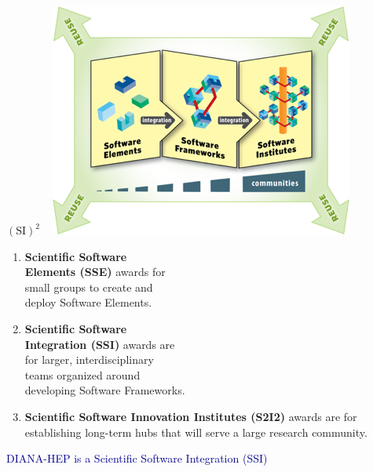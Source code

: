 \documentclass{beamer}
\begin{document}

\begin{frame}{$(\mbox{SI})^2$}
\vspace{0.75 cm}
\mbox{ } \hfill \mbox{\hspace{0.4 cm}\includegraphics[height=4 cm]{puzzle.png}\hspace{-0.4 cm}}

\vspace{-4 cm}
\begin{enumerate}
\item {\bf Scientific Software \\ Elements (SSE)} awards for \\ small groups to create and \\ deploy Software Elements.
\item {\bf Scientific Software \\ Integration (SSI)} awards are \\ for larger, interdisciplinary \\ teams organized around \\ developing Software Frameworks.
\item {\bf Scientific Software Innovation Institutes (S2I2)} awards are for establishing long-term hubs that will serve a large research community.
\end{enumerate}

\begin{center}
\textcolor{darkblue}{DIANA-HEP is a Scientific Software Integration (SSI)}
\end{center}
\end{frame}



\end{document}
